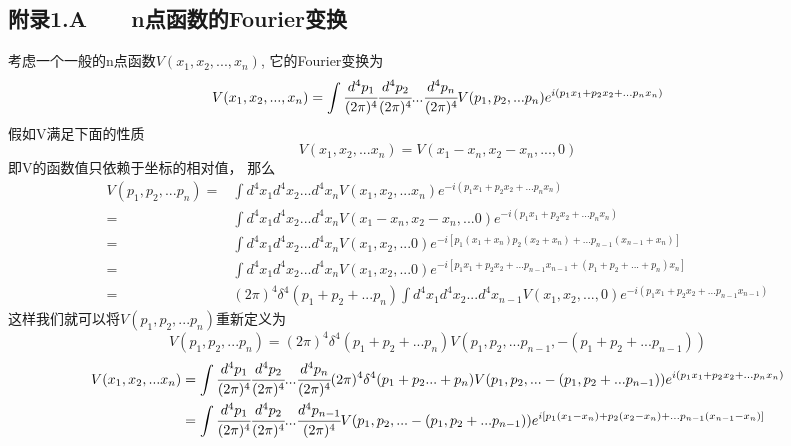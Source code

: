 \documentclass[UTF8]{ctexart}
\begin{document}
\subsection*{附录1.A~~~ n点函数的Fourier变换}
考虑一个一般的n点函数$V(x_1,x_2,...,x_n)$,
它的Fourier变换为
\begin{equation}
V(x_1,x_2,...,x_n)=\int\cfrac{d^4p_1}{(2\pi)^4}
\cfrac{d^4p_2}{(2\pi)^4}...\cfrac{d^4p_n}{(2\pi)^4}
V(p_1,p_2,...p_n)e^{i(p_1x_1+p_2x_2+...p_nx_n)}
\end{equation}
假如V满足下面的性质
\begin{equation}
V(x_1,x_2,...x_n)=V(x_1-x_n,x_2-x_n,...,0)
\end{equation}
即V的函数值只依赖于坐标的相对值，
那么
\begin{equation}
\begin{split}
V(p_1,p_2,...p_n)=&\int d^4x_1d^4x_2...d^4x_nV(x_1,x_2,...x_n)
e^{-i(p_1x_1+p_2x_2+...p_nx_n)}\\
=&\int d^4x_1d^4x_2...d^4x_nV(x_1-x_n,x_2-x_n,...0)
e^{-i(p_1x_1+p_2x_2+...p_nx_n)}\\
=&\int d^4x_1d^4x_2...d^4x_nV(x_1,x_2,...0)
e^{-i[p_1(x_1+x_n)p_2(x_2+x_n)+...p_{n-1}(x_{n-1}+x_n)]}\\
=&\int d^4x_1d^4x_2...d^4x_nV(x_1,x_2,...0)
e^{-i[p_1x_1+p_2x_2+...p_{n-1}x_{n-1}+(p_1+p_2+...+p_n)x_n]}\\
=&(2\pi)^4\delta^4(p_1+p_2+...p_n)\int d^4x_1d^4x_2...d^4x_{n-1}
V(x_1,x_2,...,0)e^{-i(p_1x_1+p_2x_2+...p_{n-1}x_{n-1})}
\end{split}
\end{equation}
这样我们就可以将$V(p_1,p_2,...p_n)$重新定义为
\begin{equation}
V(p_1,p_2,...p_n)=(2\pi)^4\delta^4(p_1+p_2+...p_n)
V(p_1,p_2,...p_{n-1},-(p_1+p_2+...p_{n-1}))
\end{equation}
\begin{equation}
\begin{split}
V(x_1,x_2,...x_n)
&=\int\cfrac{d^4p_1}{(2\pi)^4}\cfrac{d^4p_2}{(2\pi)^4}...
\cfrac{d^4p_n}{(2\pi)^4}(2\pi)^4\delta^4(p_1+p_2...+p_n)
V(p_1,p_2,...-(p_1,p_2+...p_{n-1}))e^{i(p_1x_1+p_2x_2+...p_nx_n)}\\
&=\int\cfrac{d^4p_1}{(2\pi)^4}\cfrac{d^4p_2}{(2\pi)^4}...
\cfrac{d^4p_{n-1}}{(2\pi)^4}V(p_1,p_2,...-(p_1,p_2+...p_{n-1}))
e^{i[p_1(x_1-x_n)+p_2(x_2-x_n)+...p_{n-1}(x_{n-1}-x_n)]}
\end{split}
\end{equation}
\end{document}
